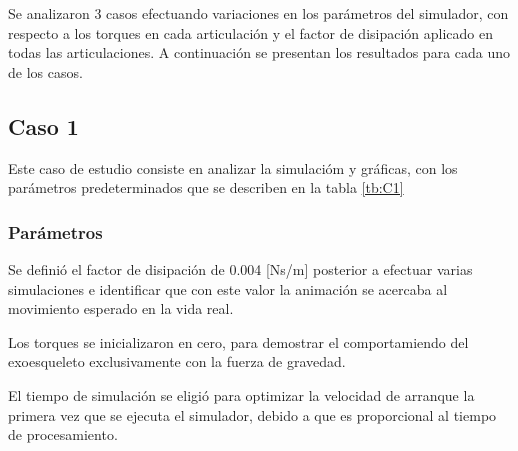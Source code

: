 Se analizaron 3 casos efectuando variaciones en los parámetros del 
simulador, con respecto a los torques en cada articulación y el factor 
de disipación aplicado en todas las articulaciones. A continuación se 
presentan los resultados para cada uno de los casos.

\subsection{Caso 1}\label{caso1}
    Este caso de estudio consiste en analizar la simulacióm y gráficas, con los 
    parámetros  predeterminados que se describen en la tabla \ref{tb:C1}

    \subsubsection{Parámetros}
    Se definió el factor de disipación de 0.004 [Ns/m] posterior a efectuar varias 
    simulaciones e identificar que con este valor la animación se acercaba al 
    movimiento esperado en la vida real.
    
    Los torques se inicializaron en cero, para demostrar el comportamiendo del 
    exoesqueleto exclusivamente con la fuerza de gravedad.
    
    El tiempo de simulación se eligió para optimizar la velocidad de arranque la 
    primera vez que se ejecuta el simulador, debido a que es proporcional al tiempo 
    de procesamiento.
    \begin{table}[H]%
        \centering
        \begin{center}
        \caption{Parámetros originales del simulador (Sistema No Conservativo)} 
        \centering
        \bigskip
        \end{center}
    \label{tb:C1}
    \end{table}


